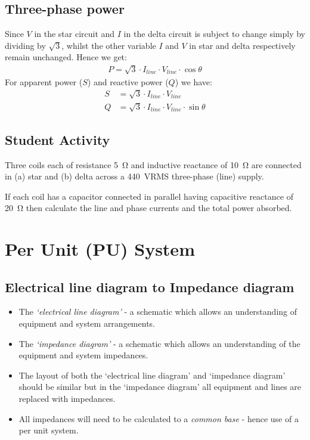 \subsection{Three-phase power}
Since $V$ in the star circuit and $I$ in the delta circuit is subject to change simply by dividing by $\sqrt{3}$, whilst the other variable $I$ and $V$ in star and delta respectively remain unchanged. Hence we get:
\begin{gather}
	P = \sqrt{3} \cdot I_{line} \cdot V_{line} \cdot \cos \theta
\end{gather}
For apparent power ($S$) and reactive power ($Q$) we have:
\begin{align}
	S & = \sqrt{3} \cdot I_{line} \cdot V_{line}                   \\
	Q & = \sqrt{3} \cdot I_{line} \cdot V_{line} \cdot \sin \theta
\end{align}
\subsection{Student Activity}
Three coils each of resistance \SI{5}{\ohm} and inductive reactance of \SI{10}{\ohm} are connected in (a) star and (b) delta across a \SI{440}{VRMS} three-phase (line) supply.

If each coil has a capacitor connected in parallel having capacitive reactance of \SI{20}{\ohm} then calculate the line and phase currents and the total power absorbed.
\section{Per Unit (PU) System}
\subsection{Electrical line diagram to Impedance diagram}
\begin{itemize}
	\item The \textit{`electrical line diagram'} - a schematic which allows an understanding of equipment and system arrangements.
	\item The \textit{`impedance diagram'} - a schematic which allows an understanding of the equipment and system impedances.
	\item The layout of both the `electrical line diagram' and `impedance diagram' should be similar but in the `impedance diagram' all equipment and lines are replaced with impedances.
	\item All impedances will need to be calculated to a \textit{common base} - hence use of a per unit system.
\end{itemize}
